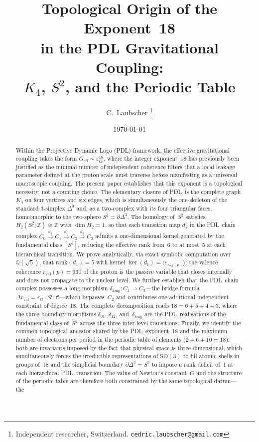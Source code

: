 \documentclass[11pt,a4paper]{article}
\theoremstyle{definition}
\newcommand{\PDL}{\textnormal{PDL}}
\newcommand{\rval}{r_{\mathrm{val}}}
\newcommand{\epsg}{\varepsilon_G}
\newcommand{\Kfour}{K_4}
\newcommand{\Sfour}{\partial\Delta^3}
\newcommand{\Hk}[1]{H_{#1}}
\newcommand{\rank}{\mathrm{rank}}
\newcommand{\dmap}[1]{d_{#1}}
\newcommand{\dlong}{\delta_{\mathrm{long}}}
\newcommand{\calR}{\mathcal{R}}
\newcommand{\calC}{\mathcal{C}}
\begin{document}
\title{%
  Topological Origin of the Exponent~18\\
  in the PDL Gravitational Coupling:\\
  $K_4$, $S^2$, and the Periodic Table%
}
\author{%
  C.~Laubscher%
  \thanks{Independent researcher, Switzerland.
    \texttt{cedric.laubscher@gmail.com}}\\[4pt]%
}
\date{\small \today}
\maketitle
\begin{abstract}
Within the Projective Dynamic Logo (\PDL) framework, the effective gravitational coupling takes the form $G_{\mathrm{eff}} \sim \epsg^{18}$, where the integer exponent~18 has previously been justified as the minimal number of independent coherence filters that a local leakage parameter defined at the proton scale must traverse before manifesting as a universal macroscopic coupling.\cite{Exponent_18_PDL_2026} The present paper establishes that this exponent is a topological necessity, not a counting choice. The elementary closure of \PDL\ is the complete graph $\Kfour$ on four vertices and six edges, which is simultaneously the one-skeleton of the standard $3$-simplex $\Delta^3$ and, as a two-complex with its four triangular faces, homeomorphic to the two-sphere $S^2 = \Sfour$. The homology of~$S^2$ satisfies $\Hk{2}(S^2;\mathbb{Z}) \cong \mathbb{Z}$ with $\dim\Hk{2} = 1$, so that each transition map $\dmap{k}$ in the \PDL\ chain complex $C_0 \xrightarrow{\dmap{0}} C_1 \xrightarrow{\dmap{1}} C_2 \xrightarrow{\dmap{2}} C_3$ admits a one-dimensional kernel generated by the fundamental class $[S^2]$, reducing the effective rank from~6 to at most~5 at each hierarchical transition. We prove analytically, via exact symbolic computation over $\mathbb{Q}(\sqrt{5})$, that $\rank(\dmap{1}) = 5$ with kernel $\ker(\dmap{1}) = \langle e_{\rval(p)}\rangle$: the valence coherence $\rval(p) = 930$ of the proton is the passive variable that closes internally and does not propagate to the nuclear level. We further establish that the \PDL\ chain complex possesses a long morphism $\dlong : C_1 \to C_3$---the bridge formula $\Delta\rval = \epsg \cdot \calR \cdot \calC$---which bypasses~$C_2$ and contributes one additional independent constraint of degree~18. The complete decomposition reads $18 = 6 + 5 + 4 + 3$, where the three boundary morphisms $\delta_{01}$, $\delta_{12}$, and~$\dlong$ are the \PDL\ realisations of the fundamental class of~$S^2$ across the three inter-level transitions. Finally, we identify the common topological ancestor shared by the \PDL\ exponent~18 and the maximum number of electrons per period in the periodic table of elements ($2+6+10 = 18$): both are invariants imposed by the fact that physical space is three-dimensional, which simultaneously forces the irreducible representations of $\mathrm{SO}(3)$ to fill atomic shells in groups of~18 and the simplicial boundary $\Sfour = S^2$ to impose a rank deficit of~1 at each hierarchical \PDL\ transition. The value of Newton's constant~$G$ and the structure of the periodic table are therefore both constrained by the same topological datum---the 
\end{abstract}
\end{document}

